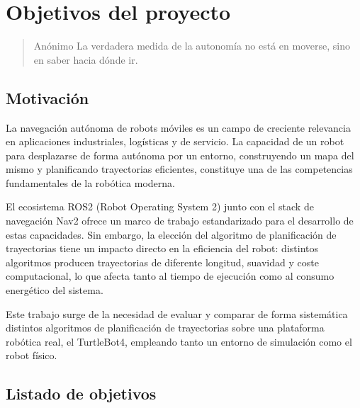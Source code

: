 \chapter{Objetivos del proyecto}

\begin{quotation}{Anónimo}
La verdadera medida de la autonomía no está en moverse, sino en saber hacia dónde ir.
\end{quotation}

\begin{abstract}
Antes de evaluar un sistema de navegación, es necesario definir qué se quiere mejorar y cómo medirlo. Este capítulo recoge la motivación del trabajo y los objetivos que estructuran su desarrollo.
\end{abstract}

\section{Motivación}

La navegación autónoma de robots móviles es un campo de creciente relevancia en aplicaciones industriales, logísticas y de servicio. La capacidad de un robot para desplazarse de forma autónoma por un entorno, construyendo un mapa del mismo y planificando trayectorias eficientes, constituye una de las competencias fundamentales de la robótica moderna.

El ecosistema ROS2 (Robot Operating System 2) junto con el stack de navegación Nav2 ofrece un marco de trabajo estandarizado para el desarrollo de estas capacidades. Sin embargo, la elección del algoritmo de planificación de trayectorias tiene un impacto directo en la eficiencia del robot: distintos algoritmos producen trayectorias de diferente longitud, suavidad y coste computacional, lo que afecta tanto al tiempo de ejecución como al consumo energético del sistema.

Este trabajo surge de la necesidad de evaluar y comparar de forma sistemática distintos algoritmos de planificación de trayectorias sobre una plataforma robótica real, el TurtleBot4, empleando tanto un entorno de simulación como el robot físico.

\section{Listado de objetivos}

